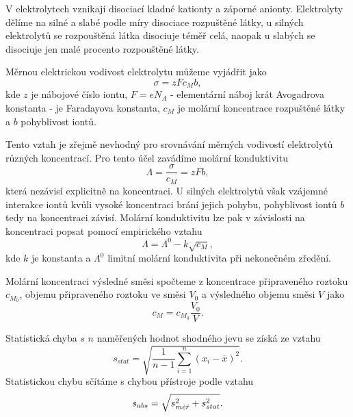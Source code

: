 \documentclass[0-protokol.tex]{subfiles}
\begin{document}
V elektrolytech vznikají disociací kladné kationty a záporné anionty. Elektrolyty dělíme na silné a slabé podle míry disociace rozpuštěné látky, u silných elektrolytů se rozpouštěná látka disociuje téměř celá, naopak u slabých se disociuje jen malé procento rozpouštěné látky.

Měrnou elektrickou vodivost elektrolytu můžeme vyjádřit jako
\begin{equation}
    \sigma = z F c_M b,
\end{equation}
kde $z$ je nábojové číslo iontu, $F = e N_A$ - elementární náboj krát Avogadrova konstanta - je Faradayova konstanta, $c_M$ je molární koncentrace rozpuštěné látky a $b$ pohyblivost iontů.

Tento vztah je zřejmě nevhodný pro srovnávání měrných vodivostí elektrolytů různých koncentrací. Pro tento účel zavádíme molární konduktivitu 
\begin{equation}
    \Lambda = \frac{\sigma}{c_M} = z F b,
\end{equation}
která nezávisí explicitně na koncentraci. U silných elektrolytů však vzájemné interakce iontů kvůli vysoké koncentraci brání jejich pohybu, pohyblivost iontů $b$ tedy na koncentraci závisí. Molární konduktivitu lze pak v závislosti na koncentraci popsat pomocí empirického vztahu
\begin{equation}
    \Lambda = \Lambda^0 - k \sqrt{c_M},
\end{equation}
kde $k$ je konstanta a $\Lambda^0$ limitní molární konduktivita při nekonečném zředění.

Molární koncentraci výsledné směsi spočteme z koncentrace připraveného roztoku $c_{M_0}$, objemu připraveného roztoku ve směsi $V_0$ a výsledného objemu směsi $V$ jako 
\begin{equation}
    c_M = c_{M_0} \frac{V_0}{V}.
\end{equation}

Statistická chyba $s$ $n$ naměřených hodnot shodného jevu se získá ze vztahu
\begin{equation} \label{eq:chyba}
s_{stat} = \sqrt{\frac{1}{n-1} \sum\limits_{i=1}^n{(x_i - \overline{x})^2}}.
\end{equation}
Statistickou chybu sčítáme s chybou přístroje podle vztahu
\begin{equation} \label{eq:chyba_soucet}
s_{abs} = \sqrt{s_{\text{\textit{měř}}}^2 + s_{stat}^2}.
\end{equation}
\end{document}
